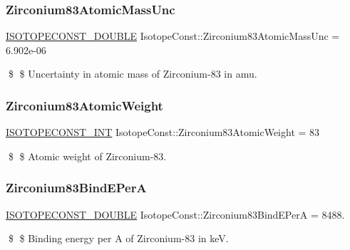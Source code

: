 \subsubsection{\texorpdfstring{Zirconium83\+Atomic\+Mass\+Unc}{Zirconium83AtomicMassUnc}}
{\footnotesize\ttfamily \mbox{\hyperlink{group___isotope_const-_macros_ga8f45a7272ce02c0b4c65c44636ed719a}{I\+S\+O\+T\+O\+P\+E\+C\+O\+N\+S\+T\+\_\+\+D\+O\+U\+B\+LE}} Isotope\+Const\+::\+Zirconium83\+Atomic\+Mass\+Unc = 6.\+902e-\/06}

\$ \$ Uncertainty in atomic mass of Zirconium-\/83 in amu. \mbox{\label{group___isotope_const-_zirconium-_zr83_gab0a372002806c7136511fcbf4441184f}} 
\subsubsection{\texorpdfstring{Zirconium83\+Atomic\+Weight}{Zirconium83AtomicWeight}}
{\footnotesize\ttfamily \mbox{\hyperlink{group___isotope_const-_macros_ga5f18360b3e99483a35c32d789e62621c}{I\+S\+O\+T\+O\+P\+E\+C\+O\+N\+S\+T\+\_\+\+I\+NT}} Isotope\+Const\+::\+Zirconium83\+Atomic\+Weight = 83}

\$ \$ Atomic weight of Zirconium-\/83. \mbox{\label{group___isotope_const-_zirconium-_zr83_ga8a928c46a7e5b69398cfc7767dec871b}} 
\subsubsection{\texorpdfstring{Zirconium83\+Bind\+E\+PerA}{Zirconium83BindEPerA}}
{\footnotesize\ttfamily \mbox{\hyperlink{group___isotope_const-_macros_ga8f45a7272ce02c0b4c65c44636ed719a}{I\+S\+O\+T\+O\+P\+E\+C\+O\+N\+S\+T\+\_\+\+D\+O\+U\+B\+LE}} Isotope\+Const\+::\+Zirconium83\+Bind\+E\+PerA = 8488.}

\$ \$ Binding energy per A of Zirconium-\/83 in keV. \mbox{\label{group___isotope_const-_zirconium-_zr83_ga0b81c26ed40d51b4bd9f6b6169c7d0ed}} 
